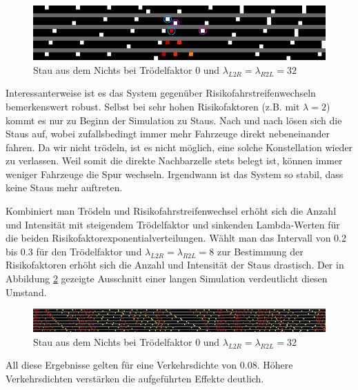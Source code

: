 \documentclass[10pt, a4paper]{article}
\begin{document}
\begin{figure}[h!]
	\centering
	\includegraphics[width=\textwidth]{img/erg_mehrspurig_stau_wegen_risikospurwechsel_p_0_r_32}
	\caption{Stau aus dem Nichts bei Trödelfaktor 0 und $\lambda_{L2R} = \lambda_{R2L} = 32$}
	\label{fig:ergStauAusDemNichtsMehrspurig_p_0_r_32}
\end{figure}

Interessanterweise ist es das System gegenüber Risikofahrstreifenwechseln bemerkenswert robust. Selbst bei sehr hohen Risikofaktoren (z.B. mit $\lambda = 2$) kommt es nur zu Beginn der Simulation zu Staus. Nach und nach lösen sich die Staus auf, wobei zufallsbedingt immer mehr Fahrzeuge direkt nebeneinander fahren. Da wir nicht trödeln, ist es nicht möglich, eine solche Konstellation wieder zu verlassen. Weil somit die direkte Nachbarzelle stets belegt ist, können immer weniger Fahrzeuge die Spur wechseln. Irgendwann ist das System so stabil, dass keine Staus mehr auftreten.

Kombiniert man Trödeln und Risikofahrstreifenwechsel erhöht sich die Anzahl und Intensität mit steigendem Trödelfaktor und sinkenden Lambda-Werten für die beiden Risikofaktorexponentialverteilungen. Wählt man das Intervall von 0.2 bis 0.3 für den Trödelfaktor und $\lambda_{L2R} = \lambda_{R2L} = 8$ zur Bestimmung der Risikofaktoren erhöht sich die Anzahl und Intensität der Staus drastisch. Der in Abbildung \ref{fig:ergMehrspurigTroedelnUndRisikowechsel} gezeigte Ausschnitt einer langen Simulation verdeutlicht diesen Umstand.

\begin{figure}[h!]
	\centering
	\includegraphics[width=\textwidth]{img/erg_mehrspurig_troedeln_und_risikowechsel}
	\caption{Stau aus dem Nichts bei Trödelfaktor 0 und $\lambda_{L2R} = \lambda_{R2L} = 32$}
	\label{fig:ergMehrspurigTroedelnUndRisikowechsel}
\end{figure}

All diese Ergebnisse gelten für eine Verkehrsdichte von 0.08. Höhere Verkehrsdichten verstärken die aufgeführten Effekte deutlich.
\end{document}
